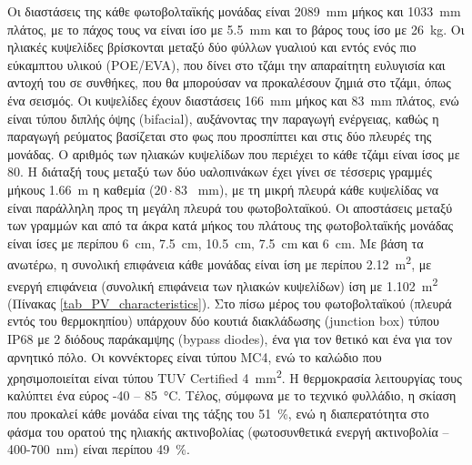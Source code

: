 \documentclass[12pt, a4paper]{report} %
\newcommand{\english}{\foreignlanguage{english}}
\begin{document}
Οι διαστάσεις της κάθε φωτοβολταϊκής μονάδας είναι \SI{2089}{\milli\meter} μήκος και \SI{1033}{\milli\meter} πλάτος, 
με το πάχος τους να είναι ίσο με \SI{5,5}{\milli\meter} και το βάρος τους ίσο με  \SI{26}{\kilo\gram}. Οι ηλιακές 
κυψελίδες βρίσκονται μεταξύ δύο φύλλων γυαλιού και εντός ενός πιο εύκαμπτου υλικού (\english{POE/EVA}), που δίνει στο 
τζάμι την απαραίτητη ευλυγισία και αντοχή του σε συνθήκες, που θα μπορούσαν να προκαλέσουν ζημιά στο τζάμι, όπως ένα 
σεισμός. Οι κυψελίδες έχουν διαστάσεις \SI{166}{\milli\meter} μήκος και \SI{83}{\milli\meter} πλάτος, ενώ είναι τύπου 
διπλής όψης (\english{bifacial}), αυξάνοντας την παραγωγή ενέργειας, καθώς η παραγωγή ρεύματος βασίζεται στο φως που 
προσπίπτει και στις δύο πλευρές της μονάδας. Ο αριθμός των ηλιακών κυψελίδων που περιέχει το κάθε τζάμι είναι ίσος με 
80. Η διάταξή τους μεταξύ των δύο υαλοπινάκων έχει γίνει σε τέσσερις γραμμές μήκους \SI{1,66}{\meter} η καθεμία 
($20 \cdot 83$ \SI{}{\milli\meter}), με τη μικρή πλευρά κάθε κυψελίδας να είναι παράλληλη προς τη μεγάλη πλευρά του φωτοβολταϊκού. 
Οι αποστάσεις μεταξύ των γραμμών και από τα άκρα κατά μήκος του πλάτους της φωτοβολταϊκής μονάδας είναι ίσες με 
περίπου \SI{6}{\centi\meter}, \SI{7,5}{\centi\meter}, \SI{10,5}{\centi\meter}, \SI{7,5}{\centi\meter} και 
\SI{6}{\centi\meter}. Με βάση τα ανωτέρω, η συνολική επιφάνεια κάθε μονάδας είναι ίση με περίπου \SI{2,12}{\meter\squared}, 
με ενεργή επιφάνεια (συνολική επιφάνεια των ηλιακών κυψελίδων) ίση με \SI{1,102}{\meter\squared} (Πίνακας 
\ref{tab_PV_characteristics}). Στο πίσω μέρος του φωτοβολταϊκού (πλευρά εντός του θερμοκηπίου) υπάρχουν δύο κουτιά 
διακλάδωσης (\english{junction box}) τύπου \english{IP68} με 2 διόδους παράκαμψης (\english{bypass diodes}), ένα για 
τον θετικό και ένα για τον αρνητικό πόλο. Οι κοννέκτορες είναι τύπου \english{MC4}, ενώ το καλώδιο που χρησιμοποιείται 
είναι τύπου \english{TUV Certified} \SI{4}{\milli\meter\squared}. Η θερμοκρασία λειτουργίας τους καλύπτει ένα εύρος 
-40 – \SI{85}{\degreeCelsius}. Τέλος, σύμφωνα με το τεχνικό φυλλάδιο, η σκίαση που προκαλεί κάθε μονάδα είναι της τάξης 
του \SI{51}{\percent}, ενώ η διαπερατότητα στο φάσμα του ορατού της ηλιακής ακτινοβολίας (φωτοσυνθετικά ενεργή ακτινοβολία 
– 400-\SI{700}{\nano\meter}) είναι περίπου \SI{49}{\percent}.
\end{document}
